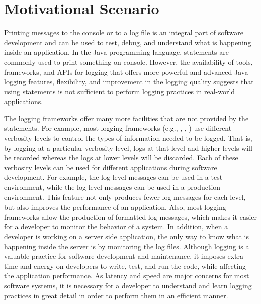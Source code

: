 \chapter{Motivational Scenario}  \label{ch2}

Printing messages to the console or to a log file is an integral part of software development and can be used to test, debug, and understand what is happening inside an application. In the Java programming language,  statements are commonly used to print something on console. However, the availability of tools, frameworks, and APIs for logging that offers more powerful and advanced Java logging features, flexibility, and improvement in the logging quality suggests that using  statements is not sufficient to perform logging practices in real-world applications.

The logging frameworks offer many more facilities that are not provided by the  statements. For example, most logging frameworks (e.g., , , ) use different verbosity levels to control the types of information needed to be logged. That is, by logging at a particular verbosity level, logs at that level and higher levels will be recorded whereas the logs at lower levels will be discarded. Each of these verbosity levels can be used for different applications during software development. For example, the  log level messages can be used in a test environment, while the  log level messages can be used in a production environment. This feature not only produces fewer log messages for each level, but also improves the performance of an application. Also, most logging frameworks allow the production of formatted log messages, which makes it easier for a developer to monitor the behavior of a system. In addition, when a developer is working on a server side application, the only way to know what is happening inside the server is by monitoring the log files. Although logging is a valuable practice for software development and maintenance, it imposes extra time and energy on developers to write, test, and run the code, while affecting the application performance. As latency and speed are major concerns for most software systems, it is necessary for a developer to understand and learn logging practices in great detail in order to perform them in an efficient manner.

